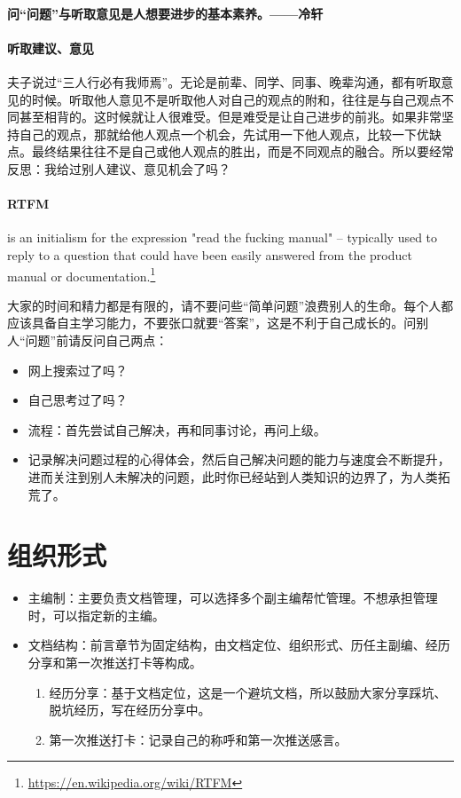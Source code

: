\documentclass[cn,11pt,chinese,twoside]{elegantbook}
\begin{document}
\paragraph{问“问题”与听取意见是人想要进步的基本素养。——冷轩}

\paragraph{听取建议、意见}
夫子说过“三人行必有我师焉”。无论是前辈、同学、同事、晚辈沟通，都有听取意见的时候。听取他人意见不是听取他人对自己的观点的附和，往往是与自己观点不同甚至相背的。这时候就让人很难受。但是难受是让自己进步的前兆。如果非常坚持自己的观点，那就给他人观点一个机会，先试用一下他人观点，比较一下优缺点。最终结果往往不是自己或他人观点的胜出，而是不同观点的融合。所以要经常反思：我给过别人建议、意见机会了吗？

\paragraph{RTFM} is an initialism for the expression "read the fucking manual" – typically used to reply to a question that could have been easily answered from the product manual or documentation.\footnote{\url{https://en.wikipedia.org/wiki/RTFM}}

大家的时间和精力都是有限的，请不要问些“简单问题”浪费别人的生命。每个人都应该具备自主学习能力，不要张口就要“答案”，这是不利于自己成长的。问别人“问题”前请反问自己两点：
\begin{itemize}
\item 网上搜索过了吗？
\item 自己思考过了吗？
\item 流程：首先尝试自己解决，再和同事讨论，再问上级。
\item 记录解决问题过程的心得体会，然后自己解决问题的能力与速度会不断提升，进而关注到别人未解决的问题，此时你已经站到人类知识的边界了，为人类拓荒了。
\end{itemize}





\section*{组织形式}
\begin{itemize}
\item 主编制：主要负责文档管理，可以选择多个副主编帮忙管理。不想承担管理时，可以指定新的主编。
\item 文档结构：前言章节为固定结构，由文档定位、组织形式、历任主副编、经历分享和第一次推送打卡等构成。
\begin{enumerate}
\item 经历分享：基于文档定位，这是一个避坑文档，所以鼓励大家分享踩坑、脱坑经历，写在经历分享中。
\item 第一次推送打卡：记录自己的称呼和第一次推送感言。
\end{enumerate}
\end{itemize}
\end{document}

